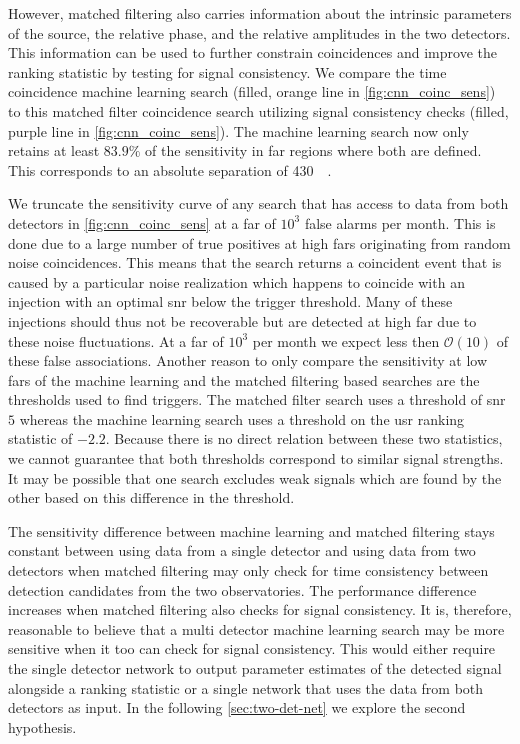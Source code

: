 However, matched filtering also carries information about the intrinsic parameters of the source, the relative phase, and the relative amplitudes in the two detectors. This information can be used to further constrain coincidences and improve the ranking statistic \cite{Nitz:2017svb} by testing for signal consistency. We compare the time coincidence machine learning search (filled, orange line in \autoref{fig:cnn_coinc_sens}) to this matched filter coincidence search utilizing signal consistency checks (filled, purple line in \autoref{fig:cnn_coinc_sens}). The machine learning search now only retains at least $83.9\%$ of the sensitivity in \acrshort{far} regions where both are defined. This corresponds to an absolute separation of \SI{430}{\mega\parsec}.

We truncate the sensitivity curve of any search that has access to data from both detectors in \autoref{fig:cnn_coinc_sens} at a \acrshort{far} of $10^3$ false alarms per month. This is done due to a large number of true positives at high \acrshort{far}s originating from random noise coincidences. This means that the search returns a coincident event that is caused by a particular noise realization which happens to coincide with an injection with an optimal \acrshort{snr} below the trigger threshold. Many of these injections should thus not be recoverable but are detected at high \acrshort{far} due to these noise fluctuations. At a \acrshort{far} of $10^3$ per month we expect less then $\mathcal{O}(10)$ of these false associations. Another reason to only compare the sensitivity at low \acrshort{far}s of the machine learning and the matched filtering based searches are the thresholds used to find triggers. The matched filter search uses a threshold of \acrshort{snr} $5$ whereas the machine learning search uses a threshold on the \acrshort{usr} ranking statistic of $-2.2$. Because there is no direct relation between these two statistics, we cannot guarantee that both thresholds correspond to similar signal strengths. It may be possible that one search excludes weak signals which are found by the other based on this difference in the threshold.

The sensitivity difference between machine learning and matched filtering stays constant between using data from a single detector and using data from two detectors when matched filtering may only check for time consistency between detection candidates from the two observatories. The performance difference increases when matched filtering also checks for signal consistency. It is, therefore, reasonable to believe that a multi detector machine learning search may be more sensitive when it too can check for signal consistency. This would either require the single detector network to output parameter estimates of the detected signal alongside a ranking statistic or a single network that uses the data from both detectors as input. In the following \autoref{sec:two-det-net} we explore the second hypothesis.

